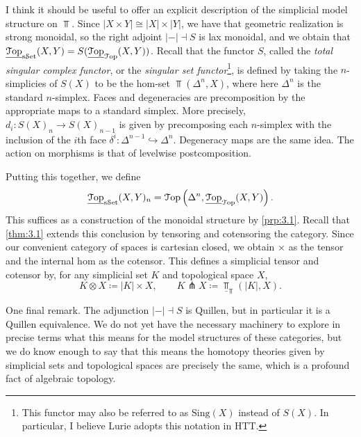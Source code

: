\begin{remark}
	I think it should be useful to offer an explicit description of the simplicial model structure on $\Top $. Since $\left| X\times Y \right| \cong \left| X \right| \times  \left| Y \right| $, we have that geometric realization is strong monoidal, so the right adjoint $\left| - \right| \dashv S$ is lax monoidal, and we obtain that $\underline{\mathcal{T}\mathrm{op} }_{\mathrm{s}\mathcal{S}\mathrm{et}}  (X,Y)=S(\underline{\mathcal{T}\mathrm{op} }_{\mathcal{T}\mathrm{op} } (X,Y))$. Recall that the functor $S$, called the \emph{total singular complex functor}, or the \emph{singular set functor}\footnote{This functor may also be referred to as $\mathrm{Sing} (X)$ instead of $S(X)$. In particular, I believe Lurie adopts this notation in HTT.}, is defined by taking the $n$-simplicies of $S(X)$ to be the hom-set $\Top (\Delta^n,X)$, where here $\Delta^n$ is the standard $n$-simplex. Faces and degeneracies are precomposition by the appropriate maps to a standard simplex. More precisely, $d_i : S(X)_n\to S(X)_{n-1}$ is given by precomposing each $n$-simplex with the inclusion of the $i$th face $\delta^i : \Delta^{n-1} \hookrightarrow \Delta^n$. Degeneracy maps are the same idea. The action on morphisms is that of levelwise postcomposition.

	Putting this together, we define
	\[
		\underline{\mathcal{T}\mathrm{op} }_{\mathrm{s}\mathcal{S}\mathrm{et}} (X,Y)_n=\mathcal{T}\mathrm{op}\left(\Delta^n,\underline{\mathcal{T}\mathrm{op} }_{\mathcal{T}\mathrm{op} }(X,Y) \right) 
	.\]
	This suffices as a construction of the monoidal structure by \cref{prp:3.1}. Recall that \cref{thm:3.1} extends this conclusion by tensoring and cotensoring the category. Since our convenient category of spaces is cartesian closed, we obtain $\times $ as the tensor and the internal hom as the cotensor. This defines a simplicial tensor and cotensor by, for any simplicial set $K$ and topological space $X$,
	\[
		K\otimes X\coloneqq \left| K \right| \times X,\qquad K\pitchfork X \coloneqq \underline{\Top }_{\Top } (\left| K \right| ,X)
	.\]
	
	One final remark. The adjunction $\left| - \right| \dashv S$ is Quillen, but in particular it is a Quillen equivalence. We do not yet have the necessary machinery to explore in precise terms what this means for the model structures of these categories, but we do know enough to say that this means the homotopy theories given by simplicial sets and topological spaces are precisely the same, which is a profound fact of algebraic topology.
\end{remark}

